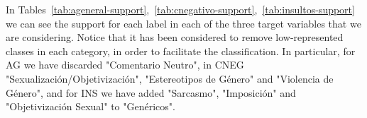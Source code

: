 
In Tables~\ref{tab:ageneral-support},~\ref{tab:cnegativo-support},~\ref{tab:insultos-support} we can see the support for each label in each of the three target variables that we are considering. Notice that it has been considered to remove low-represented classes in each category, in order to facilitate the classification. In particular, for AG we have discarded "Comentario Neutro", in CNEG "Sexualización/Objetivización", "Estereotipos de Género" and "Violencia de Género", and for INS we have added "Sarcasmo", "Imposición" and "Objetivización Sexual" to "Genéricos".


\begin{table}[H]
    \centering
    \begingroup
    \small %
    \endgroup
\end{table}


